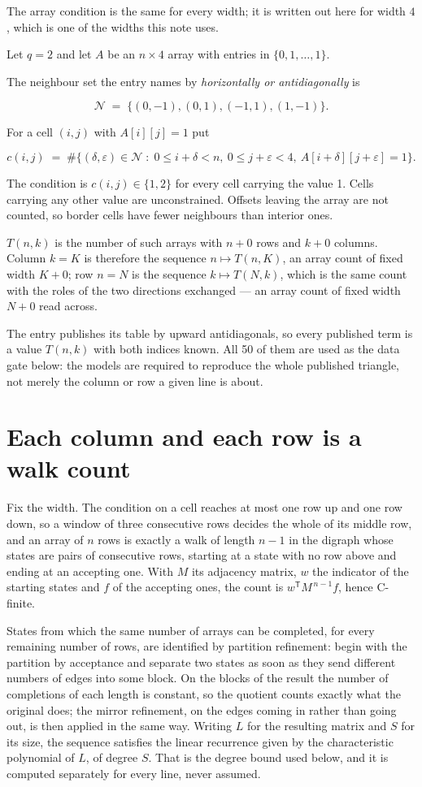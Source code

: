 \documentclass[11pt]{article}
\theoremstyle{definition}
\begin{document}
The array condition is the same for every width; it is written out here for width $4$, which is one of the widths this note uses.

Let $q = 2$ and let $A$ be an $n \times 4$ array with entries in $\{0,1,\dots,1\}$.

The neighbour set the entry names by {\itshape horizontally or antidiagonally} is

\[\mathcal{N} \;=\; \{(0,-1), (0,1), (-1,1), (1,-1)\}.\]

For a cell $(i,j)$ with $A[i][j] = 1$ put

\[c(i,j) \;=\; \#\bigl\{(\delta,\varepsilon)\in\mathcal{N} \;:\; 0\le i+\delta<n,\ 0\le j+\varepsilon<4,\ A[i+\delta][j+\varepsilon] = 1\bigr\}.\]

The condition is $c(i,j) \in \{1, 2\}$ for every cell carrying the value 1. Cells carrying any other value are unconstrained. Offsets leaving the array are not counted, so border cells have fewer neighbours than interior ones.

$T(n,k)$ is the number of such arrays with $n + 0$ rows and $k + 0$ columns. Column $k = K$ is therefore the sequence $n \mapsto T(n,K)$, an array count of fixed width $K + 0$; row $n = N$ is the sequence $k \mapsto T(N,k)$, which is the same count with the roles of the two directions exchanged --- an array count of fixed width $N + 0$ read across.

The entry publishes its table by upward antidiagonals, so every published term is a value $T(n,k)$ with both indices known. All 50 of them are used as the data gate below: the models are required to reproduce the whole published triangle, not merely the column or row a given line is about.

\section{Each column and each row is a walk count}

Fix the width. The condition on a cell reaches at most one row up and one row down, so a window of three consecutive rows decides the whole of its middle row, and an array of $n$ rows is exactly a walk of length $n-1$ in the digraph whose states are pairs of consecutive rows, starting at a state with no row above and ending at an accepting one. With $M$ its adjacency matrix, $w$ the indicator of the starting states and $f$ of the accepting ones, the count is $w^{\mathsf T}M^{\,n-1}f$, hence C-finite.

States from which the same number of arrays can be completed, for every remaining number of rows, are identified by partition refinement: begin with the partition by acceptance and separate two states as soon as they send different numbers of edges into some block. On the blocks of the result the number of completions of each length is constant, so the quotient counts exactly what the original does; the mirror refinement, on the edges coming in rather than going out, is then applied in the same way. Writing $L$ for the resulting matrix and $S$ for its size, the sequence satisfies the linear recurrence given by the characteristic polynomial of $L$, of degree $S$. That is the degree bound used below, and it is computed separately for every line, never assumed.
\end{document}
